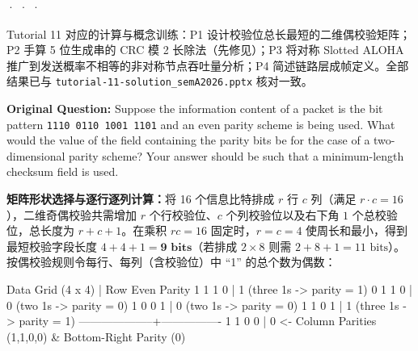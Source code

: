 

 ·  ·  · 


Tutorial 11 对应的计算与概念训练：P1 设计校验位总长最短的二维偶校验矩阵；P2 手算 5 位生成串的 CRC 模 2 长除法（先修见）；P3 将对称 Slotted ALOHA 推广到发送概率不相等的非对称节点吞吐量分析；P4 简述链路层成帧定义。全部结果已与 \texttt{tutorial-11-solution\_semA2026.pptx} 核对一致。



\textbf{Original Question:} Suppose the information content of a packet is the bit pattern \texttt{1110 0110 1001 1101} and an even parity scheme is being used. What would the value of the field containing the parity bits be for the case of a two-dimensional parity scheme? Your answer should be such that a minimum-length checksum field is used.

\textbf{矩阵形状选择与逐行逐列计算：}将 16 个信息比特排成 $r$ 行 $c$ 列（满足 $r \cdot c = 16$），二维奇偶校验共需增加 $r$ 个行校验位、$c$ 个列校验位以及右下角 $1$ 个总校验位，总长度为 $r + c + 1$。在乘积 $rc = 16$ 固定时，$r = c = 4$ 使周长和最小，得到最短校验字段长度 $4 + 4 + 1 = \mathbf{9\text{ bits}}$（若排成 $2\times 8$ 则需 $2+8+1 = 11\text{ bits}$）。按偶校验规则令每行、每列（含校验位）中 ``1'' 的总个数为偶数：

\begin{StudyCode}
Data Grid (4 x 4)   | Row Even Parity
  1   1   1   0     |   1   (three 1s -> parity = 1)
  0   1   1   0     |   0   (two 1s   -> parity = 0)
  1   0   0   1     |   0   (two 1s   -> parity = 0)
  1   1   0   1     |   1   (three 1s -> parity = 1)
--------------------+----------------
  1   1   0   0     |   0   <- Column Parities (1,1,0,0) & Bottom-Right Parity (0)
\end{StudyCode}

